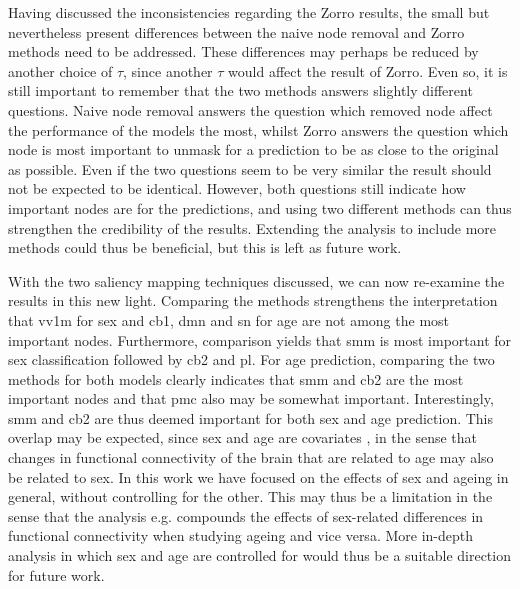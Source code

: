 Having discussed the inconsistencies regarding the Zorro results, the small but nevertheless present differences between the naive node removal and Zorro methods need to be addressed. These differences may perhaps be reduced by another choice of $\tau$, since another $\tau$ would affect the result of Zorro. Even so, it is still important to remember that the two methods answers slightly different questions. Naive node removal answers the question which removed node affect the performance of the models the most, whilst Zorro answers the question which node is most important to unmask for a prediction to be as close to the original as possible. Even if the two questions seem to be very similar the result should not be expected to be identical. However, both questions still indicate how important nodes are for the predictions, and using two different methods can thus strengthen the credibility of the results. Extending the analysis to include more methods could thus be beneficial, but this is left as future work.


With the two saliency mapping techniques discussed, we can now re-examine the results in this new light. Comparing the methods  strengthens the interpretation that \acrshort{vv1m} for sex and \acrshort{cb1}, \acrshort{dmn} and \acrshort{sn} for age are not among the most important nodes. Furthermore, comparison yields that \acrshort{smm} is most important for sex classification followed by \acrshort{cb2} and \acrshort{pl}. For age prediction, comparing the two methods for both models clearly indicates that \acrshort{smm} and \acrshort{cb2} are the most important nodes and that \acrshort{pmc} also may be somewhat important. Interestingly, \acrshort{smm} and \acrshort{cb2} are thus deemed important for both sex and age prediction. This overlap may be expected, since sex and age are covariates \cite{zhang_covariates}, in the sense that changes in functional connectivity of the brain that are related to age may also be related to sex. In this work we have focused on the effects of sex and ageing in general, without controlling for the other. This may thus be a limitation in the sense that the analysis e.g. compounds the effects of sex-related differences in functional connectivity when studying ageing and vice versa. More in-depth analysis in which sex and age are controlled for would thus be a suitable direction for future work.

